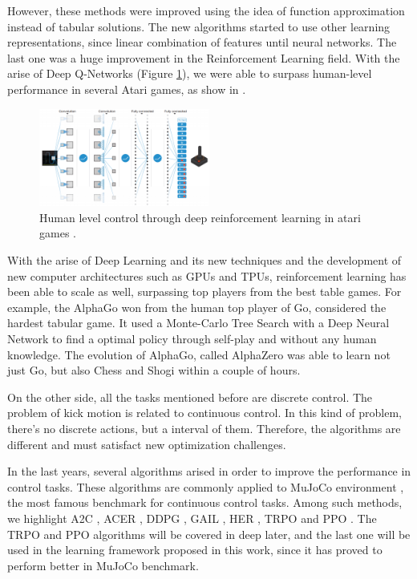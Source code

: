 However, these methods were improved using the idea of function approximation instead of tabular solutions. The new algorithms started to use other learning representations, since linear combination of features until neural networks. The last one was a huge improvement in the Reinforcement Learning field. With the arise of Deep Q-Networks (Figure \ref{dqn}), we were able to surpass human-level performance in several Atari games, as show in \cite{mnih2015humanlevel}.

\begin{figure}[ht!]
	\centering
	\includegraphics[width=0.5\textwidth]{Cap2/dqn.eps}
	\caption{Human level control through deep reinforcement learning in atari games
		\cite{mnih2015humanlevel}.}
	\label{dqn}
\end{figure}

With the arise of Deep Learning and its new techniques and the development of new computer architectures such as GPUs and TPUs, reinforcement learning has been able to scale as well, surpassing top players from the best table games. For example, the AlphaGo \cite{alphago} won from the human top player of Go, considered the hardest tabular game. It used a Monte-Carlo Tree Search with a Deep Neural Network to find a optimal policy through self-play and without any human knowledge. The evolution of AlphaGo, called AlphaZero \cite{alphazero} was able to learn not just Go, but also Chess and Shogi within a couple of hours.

On the other side, all the tasks mentioned before are discrete control. The problem of kick motion is related to continuous control. In this kind of problem, there's no discrete actions, but a interval of them. Therefore, the algorithms are different and must satisfact new optimization challenges.

In the last years, several algorithms arised in order to improve the performance in control tasks. These algorithms are commonly applied to MuJoCo environment \cite{mujoco}, the most famous benchmark for continuous control tasks. Among such methods, we highlight A2C \cite{a2c}, ACER \cite{acer}, DDPG \cite{ddpg}, GAIL \cite{gail}, HER \cite{her}, TRPO \cite{trpo} and PPO \cite{ppoalgorithm}. The TRPO and PPO algorithms will be covered in deep later, and the last one will be used in the learning framework proposed in this work, since it has proved to perform better in MuJoCo benchmark.

